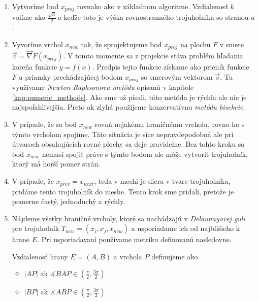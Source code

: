 \begin{enumerate}
    \item{
        Vytvoríme bod $x_{proj}$ rovnako ako v základnom algoritme. Vzdialenosť $k$ volíme
        ako $\frac{\sqrt 3}{2} \, a$ keďže toto je výška rovnostranného trojuholníka so stranou $a$.
    }
    \item{
        Vyvoríme vrchol $x_{new}$ tak, že sprojektujeme bod $x_{proj}$ na plochu $F$ v smere 
        $\overrightarrow{v} = \overrightarrow{\nabla} F(x_{proj})$. V tomto momente sa z projekcie 
        stáva problém hľadania koreňa funkcie $y = f(x)$. Predpis tejto funkcie získame ako prienik 
        funkcie $F$ a priamky prechádzajúcej bodom $x_{proj}$ so smerovým vektorom $\overrightarrow{v}$. 
        Tu využívame
        \textit{Newton-Raphsonovu metódu} opísanú v kapitole \ref{kap:numeric_methods}. Ako sme 
        už písali, táto metóda je rýchla ale nie je najspoľahlivejšia. Preto ak zlyhá
        použijeme konzervatívnu \textit{metódu bisekcie}.
    }
    \item{
        V prípade, že sa bod $x_{new}$ rovná nejakému hraničnému vrcholu, rovno ho s týmto vrcholom
        spojíme. Táto situácia je síce nepravdepodobná ale pri útvaroch obsahujúcich rovné plochy sa
        deje pravidelne. Bez tohto kroku sa bod $x_{new}$ nemusí spojiť práve s týmto bodom ale
        môže vytvoriť trojuholník, ktorý má horší pomer strán.
    }
    \item{
        V prípade, že $x_{prev} = x_{next}$, teda v meshi je diera v tvare trojuholníka, pridáme tento 
        trojuholník do meshe. Tento krok sme pridali, pretože je pomerne častý, jednoduchý a rýchly.
    }
    \item{
        Nájdeme všetky hraničné vrcholy, ktoré sa nachádzajú v \textit{Delaunayovej guli} pre trojuholník 
        $T_{new} = (x_i, x_j, x_{new})$ a usporiadame ich od najblišieho k hrane $E$. Pri usporiadavaní 
        používame metriku definovanú nasledovne.

        \begin{definition} Vzdialenosť hrany $E=(A,B)$ a vrchola $P$ definujeme ako
        \label{def:segment_point_distance}
        \begin{itemize}
            \item{
                $|AP|$ ak $\measuredangle BAP \in (\frac{\pi}{2}, \frac{3\pi}{2})$
            }

            \item{
                $|BP|$ ak $\measuredangle ABP \in (\frac{\pi}{2}, \frac{3\pi}{2})$
            }


\end{itemize}
\end{definition}}
\end{enumerate}
